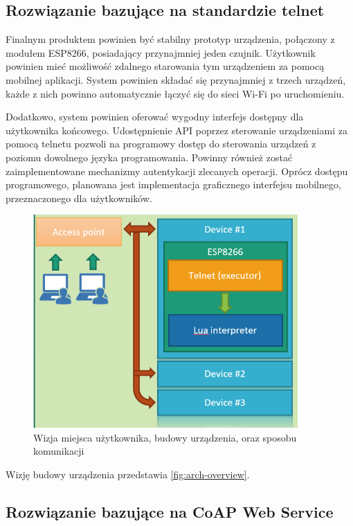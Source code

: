 \subsection{Rozwiązanie bazujące na standardzie telnet}
Finalnym produktem powinien być stabilny prototyp urządzenia, połączony z modułem ESP8266, posiadający przynajmniej jeden czujnik. Użytkownik powinien mieć możliwość zdalnego starowania tym urządzeniem za pomocą mobilnej aplikacji. System powinien składać się przynajmniej z trzech urządzeń, każde z nich powinno automatycznie łączyć się do sieci Wi-Fi po uruchomieniu. 

Dodatkowo, system powinien oferować wygodny interfejs dostępny dla użytkownika końcowego. Udostępnienie API poprzez sterowanie urządzeniami za pomocą telnetu pozwoli na programowy dostęp do sterowania urządzeń z poziomu dowolnego języka programowania. Powinny również zostać zaimplementowane mechanizmy autentykacji zlecanych operacji. Oprócz dostępu programowego, planowana jest implementacja graficznego interfejsu mobilnego, przeznaczonego dla użytkowników\cite{kukdm-art}.

\begin{figure}[!htbp]
	\centering
	\includegraphics[width=0.9\textwidth]{images/fig01-arch-overview.png}
	\caption[Wizja architektury systemu.]{Wizja miejsca użytkownika, budowy urządzenia, oraz sposobu komunikacji}
	\label{fig:arch-overview}
\end{figure}

Wizję budowy urządzenia przedstawia \autoref{fig:arch-overview}.

\subsection{Rozwiązanie bazujące na CoAP Web Service}

